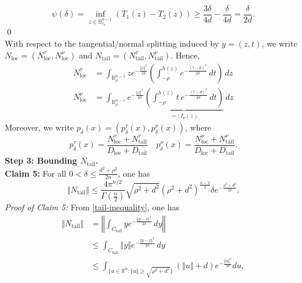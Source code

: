 \documentclass[11pt]{amsart}
\newcommand{\1}{\mathds{1}}
\theoremstyle{definition}
\theoremstyle{remark}
\theoremstyle{definition}
\begin{document}
$$
\psi(\delta)=\inf_{z\in \mathbb{B}^{n-1}_{r_{\delta}}} (T_1(z)-T_2(z))\geq \frac{3\delta}{4d}-\frac{\delta}{4d}=\frac{\delta}{2d}.
$$ \qed\\
With respect to the tangential/normal splitting induced by $y=(z,t)$, we write
$N_{\operatorname{loc}}=(N_{\operatorname{loc}}^{\tau},N_{\operatorname{loc}}^{\nu})$ and $N_{\operatorname{tail}}=(N_{\operatorname{tail}}^{\tau},N_{\operatorname{tail}}^{\nu})$. Hence,
\begin{equation*}
    \begin{aligned}
        N_{\operatorname{loc}}^{\tau}&=\int_{\mathbb{B}_{\rho}^{n-1}} ze^{-\frac{\Vert z\Vert^2}{2\delta}} \left(\int_{-\rho}^{h(z)}  e^{-\frac{(t-d)^2}{2\delta}}\,dt\right)\,dz\\
        N_{\operatorname{loc}}^{\nu}&=\int_{\mathbb{B}_{\rho}^{n-1}} e^{-\frac{\Vert z\Vert^2}{2\delta}} \underbrace{\left(\int_{-\rho}^{h(z)} t\, e^{-\frac{(t-d)^2}{2\delta}}\,dt\right)}_{=:I_{\nu}(z)}\,dz
    \end{aligned}
\end{equation*}
Moreover, we write $p_{\delta}(x)=(p_{\delta}^{\tau}(x),p_{\delta}^{\nu}(x))$, where 
\begin{equation}\label{decomposition-tn}
p_{\delta}^{\tau}(x)=\frac{N_{\operatorname{loc}}^{\tau}+N_{\operatorname{tail}}^{\tau}}{D_{\operatorname{loc}}+D_{\operatorname{tail}}} \quad p_{\delta}^{\nu}(x)=\frac{N_{\operatorname{loc}}^{\nu}+N_{\operatorname{tail}}^{\nu}}{D_{\operatorname{loc}}+D_{\operatorname{tail}}}.
\end{equation}
\noindent\textbf{Step 3: Bounding $N_{\operatorname{tail}}$.}\\
\textbf{Claim 5:} For all $0<\delta\leq \frac{d^2+\rho^2}{2n}$, one has 
$$
\Vert N_{\operatorname{tail}}\Vert\leq \frac{4\pi^{n/2}}{\Gamma\left(\frac{n}{2}\right)}\sqrt{\rho^2+d^2}(\rho^2+d^2)^{\frac{n-2}{2}} \delta e^{-\frac{\rho^2+d^2}{2\delta}}.
$$
\emph{Proof of Claim 5:} From \eqref{tail-inequality}, one has
\begin{equation*}
    \begin{aligned}
\Vert N_{\operatorname{tail}}\Vert &=\left\Vert \int_{C_{\operatorname{tail}}} ye^{-\frac{\Vert y-x\Vert^2}{2\delta}}\,dy\right\Vert \\
&\leq \int_{C_{\operatorname{tail}}} \Vert y\Vert e^{-\frac{\Vert y-x\Vert^2}{2\delta}}\,dy\\
&\leq \int_{\{ u \in \mathbb{R}^n : \Vert u\Vert \geq \sqrt{\rho^2+d^2}\}} (\Vert u\Vert +d)e^{-\frac{\Vert u \Vert^2}{2\delta}}du,
    \end{aligned}
\end{equation*}
\end{document}
